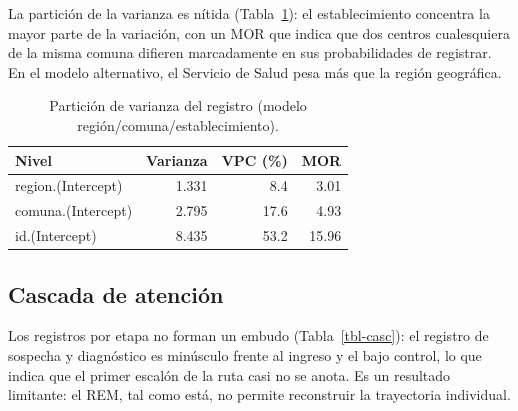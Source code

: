 \documentclass[
  spanish,
  letterpaper,
  DIV=11,
  numbers=noendperiod]{scrartcl}
\begin{document}
La partición de la varianza es nítida (Tabla~\ref{tbl-ml}): el
establecimiento concentra la mayor parte de la variación, con un MOR que
indica que dos centros cualesquiera de la misma comuna difieren
marcadamente en sus probabilidades de registrar. En el modelo
alternativo, el Servicio de Salud pesa más que la región geográfica.

{

\begin{longtable}[]{@{}lrrr@{}}

\caption{\label{tbl-ml}Partición de varianza del registro (modelo
región/comuna/establecimiento).}

\tabularnewline

\toprule\noalign{}
Nivel & Varianza & VPC (\%) & MOR \\
\midrule\noalign{}
\endhead
\bottomrule\noalign{}
\endlastfoot
region.(Intercept) & 1.331 & 8.4 & 3.01 \\
comuna.(Intercept) & 2.795 & 17.6 & 4.93 \\
id.(Intercept) & 8.435 & 53.2 & 15.96 \\

\end{longtable}

}

\subsection{Cascada de atención}\label{cascada-de-atenciuxf3n}

Los registros por etapa no forman un embudo (Tabla~\ref{tbl-casc}): el
registro de sospecha y diagnóstico es minúsculo frente al ingreso y el
bajo control, lo que indica que el primer escalón de la ruta casi no se
anota. Es un resultado limitante: el REM, tal como está, no permite
reconstruir la trayectoria individual.
\end{document}

